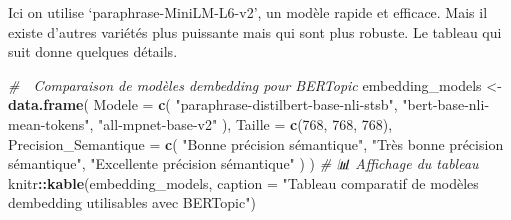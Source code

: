 \documentclass[
]{article}
\newenvironment{Shaded}{\begin{snugshade}}{\end{snugshade}}
\newcommand{\AttributeTok}[1]{\textcolor[rgb]{0.13,0.29,0.53}{#1}}
\newcommand{\CommentTok}[1]{\textcolor[rgb]{0.56,0.35,0.01}{\textit{#1}}}
\newcommand{\DecValTok}[1]{\textcolor[rgb]{0.00,0.00,0.81}{#1}}
\newcommand{\FunctionTok}[1]{\textcolor[rgb]{0.13,0.29,0.53}{\textbf{#1}}}
\newcommand{\NormalTok}[1]{#1}
\newcommand{\OtherTok}[1]{\textcolor[rgb]{0.56,0.35,0.01}{#1}}
\newcommand{\SpecialCharTok}[1]{\textcolor[rgb]{0.81,0.36,0.00}{\textbf{#1}}}
\newcommand{\StringTok}[1]{\textcolor[rgb]{0.31,0.60,0.02}{#1}}
\begin{document}
Ici on utilise `paraphrase-MiniLM-L6-v2', un modèle rapide et efficace.
Mais il existe d'autres variétés plus puissante mais qui sont plus
robuste. Le tableau qui suit donne quelques détails.

\begin{Shaded}
\begin{Highlighting}[]
\CommentTok{\# 🧮 Comparaison de modèles d\textquotesingle{}embedding pour BERTopic}
\NormalTok{embedding\_models }\OtherTok{\textless{}{-}} \FunctionTok{data.frame}\NormalTok{(}
  \AttributeTok{Modele =} \FunctionTok{c}\NormalTok{(}
    \StringTok{"paraphrase{-}distilbert{-}base{-}nli{-}stsb"}\NormalTok{,}
    \StringTok{"bert{-}base{-}nli{-}mean{-}tokens"}\NormalTok{,}
    \StringTok{"all{-}mpnet{-}base{-}v2"}
\NormalTok{  ),}
  \AttributeTok{Taille =} \FunctionTok{c}\NormalTok{(}\DecValTok{768}\NormalTok{, }\DecValTok{768}\NormalTok{, }\DecValTok{768}\NormalTok{),}
  \AttributeTok{Precision\_Semantique =} \FunctionTok{c}\NormalTok{(}
    \StringTok{"Bonne précision sémantique"}\NormalTok{,}
    \StringTok{"Très bonne précision sémantique"}\NormalTok{,}
    \StringTok{"Excellente précision sémantique"}
\NormalTok{  )}
\NormalTok{)}
\CommentTok{\# 📊 Affichage du tableau}
\NormalTok{knitr}\SpecialCharTok{::}\FunctionTok{kable}\NormalTok{(embedding\_models, }\AttributeTok{caption =} \StringTok{"Tableau comparatif de modèles d\textquotesingle{}embedding utilisables avec BERTopic"}\NormalTok{)}
\end{Highlighting}
\end{Shaded}
\end{document}
